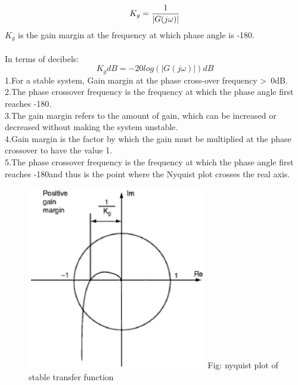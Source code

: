 \begin{enumerate}[label=\thesection.\arabic*.,ref=\thesection.\theenumi]
\begin{equation}
   \\ K_g = \frac{1}{|G(j\omega)|}
\end{equation} 
$K_g$ is the gain margin
at the frequency at which phase angle
is -180\degree.
\\\\ 
In terms of decibels: 
\begin{equation}
    K_g dB = -20log(|G(j\omega)|) dB
\end{equation}
1.For a stable system, Gain margin at the phase cross-over frequency \textgreater \ 0dB. \\
2.The phase crossover frequency is the frequency at which the phase angle first reaches -180\degree. \\
3.The gain margin refers to the amount of gain, which can be increased or decreased without making the system unstable. \\
4.Gain margin is the factor by which the gain must be multiplied at the phase crossover to have the value 1. \\
5.The phase crossover frequency is the frequency at which the phase angle first reaches -180\degree and thus is the point where the Nyquist plot crosses the real axis. \\
\begin{figure}[h]
    \centering
    \includegraphics[width=1\linewidth, height=8cm]{./figs/1.eps}
    Fig: nyquist plot of stable transfer function
\end{figure}


\end{enumerate}
